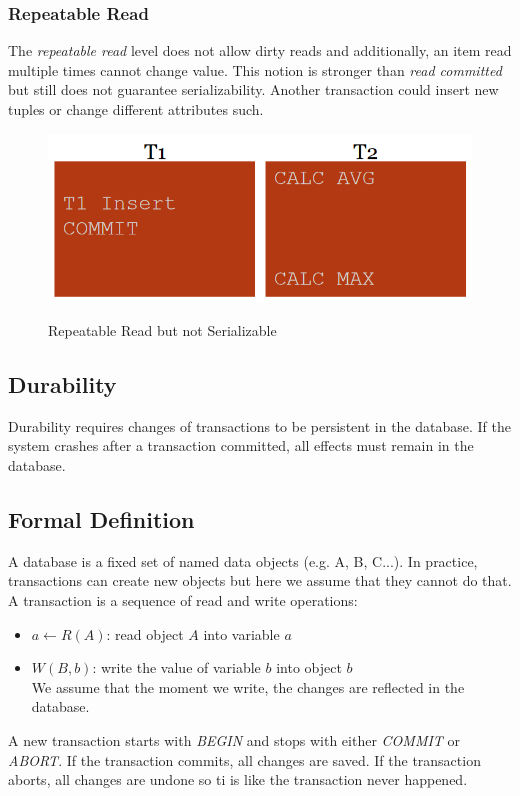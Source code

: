 \subsubsection{Repeatable Read}
The \textit{repeatable read} level does not allow dirty reads and additionally, an item read multiple times cannot change value. This notion is stronger than \textit{read committed} but still does not guarantee serializability. Another transaction could insert new tuples or change different attributes such. 
\begin{figure}[H]
\centering
\includegraphics[width=.3\textwidth]{images/repeatable_read.PNG}
\label{repeatable_read.PNG}
\caption{Repeatable Read but not Serializable}
\end{figure}

\subsection{Durability}
Durability requires changes of transactions to be persistent in the database. If the system crashes after a transaction committed, all effects must remain in the database.

\subsection{Formal Definition}
A database is a fixed set of named data objects (e.g. A, B, C...). In practice, transactions can create new objects but here we assume that they cannot do that. A transaction is a sequence of read and write operations:
\begin{itemize}
\item $a \gets R(A)$: read object $A$ into variable $a$
\item $W(B, b)$: write the value of variable $b$ into object $b$\\
We assume that the moment we write, the changes are reflected in the database.
\end{itemize}
A new transaction starts with \textit{BEGIN} and stops with either \textit{COMMIT} or \textit{ABORT}. If the transaction commits, all changes are saved. If the transaction aborts, all changes are undone so ti is like the transaction never happened.


